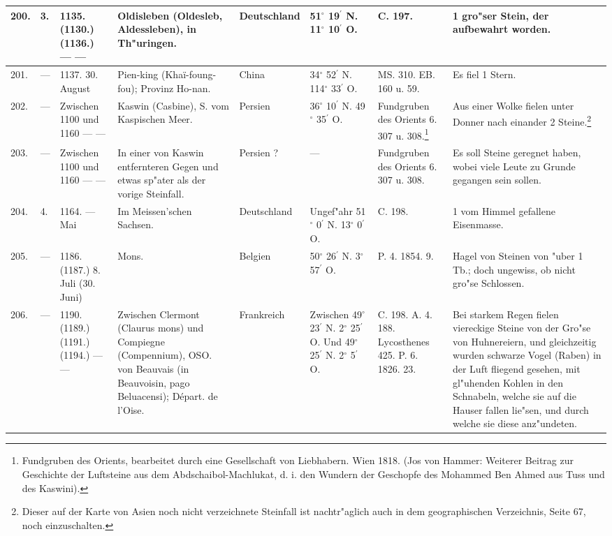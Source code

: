 \documentclass[a4paper, 8pt, oneside, polutonikogreek, german]{article}
\begin{document}
\begin{center}
\begin{longtable}{| p{5mm} | p{3mm} | p{15mm} | p{25mm} | p{20mm} | p{14mm} | p{17mm} | p{24mm} |}
        200. & 3. & 1135. (1130.) (1136.) --- --- & Oldisleben (Oldesleb, Aldessleben), in Th"uringen. & Deutschland & 51$^\circ$ 19$^\prime$ N. 11$^\circ$ 10$^\prime$ O. & C. 197. & 1 gro"ser Stein, der aufbewahrt worden. \\ \hline
        201. & --- & 1137. 30. August & Pien-king (Khaï-foung-fou); Provinz Ho-nan. & China & 34$^\circ$ 52$^\prime$ N. 114$^\circ$ 33$^\prime$ O. & MS. 310. EB. 160 u. 59. & Es fiel 1 Stern. \\ \hline
        202. & --- & Zwischen 1100 und 1160 --- --- & Kaswin (Casbine), S. vom Kaspischen Meer. & Persien & 36$^\circ$ 10$^\prime$ N. 49$^\circ$ 35$^\prime$ O. & Fundgruben des Orients 6. 307 u. 308.\footnote{Fundgruben des Orients, bearbeitet durch eine Gesellschaft von Liebhabern. Wien 1818. (Jos von Hammer: Weiterer Beitrag zur Geschichte der Luftsteine aus dem Abdschaibol-Machlukat, d. i. den Wundern der Geschopfe des Mohammed Ben Ahmed aus Tuss und des Kaswini).} & Aus einer Wolke fielen unter Donner nach einander 2 Steine.\footnote{Dieser auf der Karte von Asien noch nicht verzeichnete Steinfall ist nachtr"aglich auch in dem geographischen Verzeichnis, Seite 67, noch einzuschalten.} \\ \hline
        203. & --- & Zwischen 1100 und 1160 --- --- & In einer von Kaswin entfernteren Gegen und etwas sp"ater als der vorige Steinfall. & Persien ? & --- & Fundgruben des Orients 6. 307 u. 308. & Es soll Steine geregnet haben, wobei viele Leute zu Grunde gegangen sein sollen. \\ \hline
        204. & 4. & 1164. --- Mai & Im Meissen’schen Sachsen. & Deutschland & Ungef"ahr 51$^\circ$ 0$^\prime$ N. 13$^\circ$ 0$^\prime$ O. & C. 198. & 1 vom Himmel gefallene Eisenmasse. \\ \hline
        205. & --- & 1186. (1187.) 8. Juli (30. Juni) & Mons. & Belgien & 50$^\circ$ 26$^\prime$ N. 3$^\circ$ 57$^\prime$ O. & P. 4. 1854. 9. & Hagel von Steinen von "uber 1 Tb.; doch ungewiss, ob nicht gro"se Schlossen. \\ \hline
        206. & --- & 1190. (1189.) (1191.) (1194.) --- --- & Zwischen Clermont (Claurus mons) und Compiegne (Compennium), OSO. von Beauvais (in Beauvoisin, pago Beluacensi); Départ. de l’Oise. & Frankreich & Zwischen 49$^\circ$ 23$^\prime$ N. 2$^\circ$ 25$^\prime$ O. Und 49$^\circ$ 25$^\prime$ N. 2$^\circ$ 5$^\prime$ O. & C. 198. A. 4. 188. Lycosthenes 425. P. 6. 1826. 23. & Bei starkem Regen fielen viereckige Steine von der Gro"se von Huhnereiern, und gleichzeitig wurden schwarze Vogel (Raben) in der Luft fliegend gesehen, mit gl"uhenden Kohlen in den Schnabeln, welche sie auf die Hauser fallen lie"sen, und durch welche sie diese anz"undeten. \\ \hline

\end{longtable}
\end{center}
\end{document}
